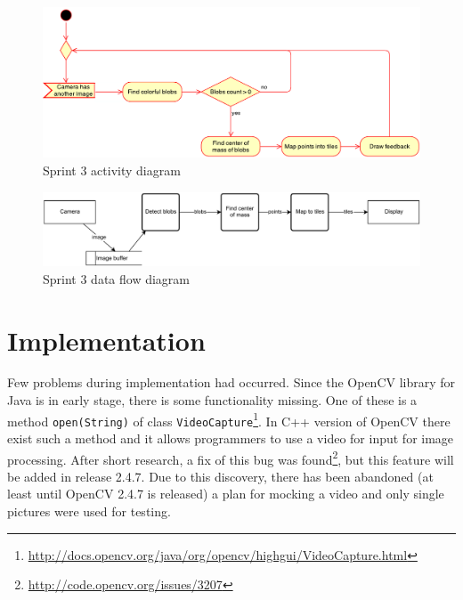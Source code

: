 \begin{figure}[h]
	\centering
		\includegraphics[width=16.2cm]{sprint3/activity_sprint3.pdf}
	\caption{Sprint 3 activity diagram}
	\label{fig:sprint3_activity_diagram}
\end{figure}


\begin{figure}[h]
	\centering
		\includegraphics[width=16.2cm]{sprint3/sprint3_dtd.pdf}
	\caption{Sprint 3 data flow diagram}
	\label{fig:sprint3_dfd}
\end{figure}


\section{Implementation}
\label{sec:sprint3_implementation}
Few problems during implementation had occurred. 
Since the OpenCV library for Java is in early stage, there is some functionality missing.
One of these is a method \texttt{open(String)} of class \texttt{VideoCapture}\footnote{\url{http://docs.opencv.org/java/org/opencv/highgui/VideoCapture.html}}.
In C++ version of OpenCV there exist such a method and it allows programmers to use a video for input for image processing.
After short research, a fix of this bug was found\footnote{\url{http://code.opencv.org/issues/3207}}, but this feature will be added in release 2.4.7.
Due to this discovery, there has been abandoned (at least until OpenCV 2.4.7 is released) a plan for mocking a video and only single pictures were used for testing.


